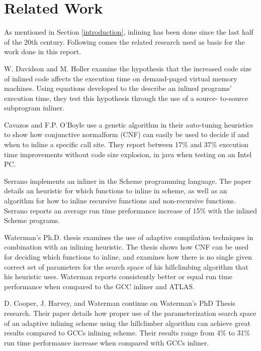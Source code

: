 
\section{Related Work}


As mentioned in Section \ref{introduction}, inlining has been done since the
last half of the 20th century. Following comes the related research used as
basis for the work done in this report.

W. Davidson and M. Holler \cite{SubprogInlining} examine the hypothesis that the
increased code size of inlined code affects the execution time on demand-paged
virtual memory machines. Using equations developed to the describe an inlined
programs' execution time, they test this hypothesis through the use of a source-
to-source subprogram inliner.

Cavazos and F.P. O'Boyle \cite{AutoTuningJavaHeuristics} use a genetic algorithm
in their auto-tuning heuristics to show how conjunctive normalform (CNF) can
easily be used to decide if and when to inline a specific call site. They report
between 17\% and 37\% execution time improvements without code size explosion,
in java when testing on an Intel PC.

Serrano \cite{InlineWhenHowSerrano} implements an inliner in the Scheme
programming language. The paper details an heuristic for which functions to
inline in scheme, as well as an algorithm for how to inline recursive functions
and non-recursive functions. Serrano reports an average run time preformance
increase of 15\% with the inlined Scheme programs.

Waterman's Ph.D. thesis \cite{AdaptvCompilAndInlingWaterman} examines the use of
adaptive compilation techniques in combination with an inlining heuristic. The
thesis shows how CNF can be used for deciding which functions to inline, and
examines how there is no single given correct set of parameters for the search
space of his hillclimbing algorithm that his heuristic uses. Waterman reports
consistently better or equal run time performance when compared to the GCC
inliner and ATLAS.

D. Cooper, J. Harvey, and Waterman \cite{AdaptvStratInlSubst} continue on
Waterman's PhD Thesis \cite{AdaptvCompilAndInlingWaterman} research. Their paper
details how proper use of the parameterization search space of an adaptive
inlining scheme using the hillclimber algorithm can achieve great results
compared to GCCs inlining scheme. Their results range from 4\% to 31\% run time
performance increase when compared with GCCs inliner.


